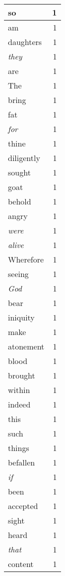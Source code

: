 \begin{center}
\begin{longtable}{l|r}
so & 1 \\ \hline
am & 1 \\ \hline
daughters & 1 \\ \hline
\emph{they} & 1 \\ \hline
are & 1 \\ \hline
The & 1 \\ \hline
bring & 1 \\ \hline
fat & 1 \\ \hline
\emph{for} & 1 \\ \hline
thine & 1 \\ \hline
diligently & 1 \\ \hline
sought & 1 \\ \hline
goat & 1 \\ \hline
behold & 1 \\ \hline
angry & 1 \\ \hline
\emph{were} & 1 \\ \hline
\emph{alive} & 1 \\ \hline
Wherefore & 1 \\ \hline
seeing & 1 \\ \hline
\emph{God} & 1 \\ \hline
bear & 1 \\ \hline
iniquity & 1 \\ \hline
make & 1 \\ \hline
atonement & 1 \\ \hline
blood & 1 \\ \hline
brought & 1 \\ \hline
within & 1 \\ \hline
indeed & 1 \\ \hline
this & 1 \\ \hline
such & 1 \\ \hline
things & 1 \\ \hline
befallen & 1 \\ \hline
\emph{if} & 1 \\ \hline
been & 1 \\ \hline
accepted & 1 \\ \hline
sight & 1 \\ \hline
heard & 1 \\ \hline
\emph{that} & 1 \\ \hline
content & 1 \\ \hline
\end{longtable}
\end{center}



\normalsize



